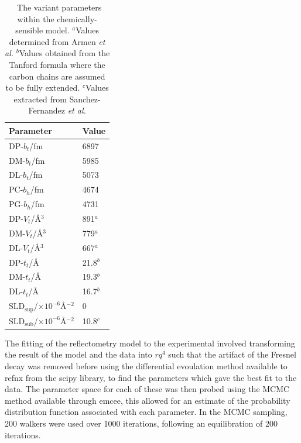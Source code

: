 \documentclass[twoside,twocolumn,9pt]{article}
\begin{document}

\begin{table}[h]
	\small
	\caption{\ The variant parameters within the chemically-sensible model. $^a$Values determined from Armen \emph{et al.}\cite{Armen1998} $^b$Values obtained from the Tanford formula where the carbon chains are assumed to be fully extended.\cite{Tanford1980} $^c$Values extracted from Sanchez-Fernandez \emph{et al.}\cite{Sanchez-Fernandez2016}}
	\label{tab:invariant}
	\begin{tabular*}{0.48\textwidth}{@{\extracolsep{\fill}}ll}
		\hline
		Parameter & Value \\
		\hline
		DP-$b_t$/fm & 6897 \\
		DM-$b_t$/fm & 5985 \\
		DL-$b_t$/fm & 5073 \\
		PC-$b_h$/fm & 4674 \\
		PG-$b_h$/fm & 4731 \\
		DP-$V_t$/\AA$^3$ & 891$^a$ \\
		DM-$V_t$/\AA$^3$ & 779$^a$ \\
		DL-$V_t$/\AA$^3$ & 667$^a$ \\	
		DP-$t_t$/\AA & 21.8$^b$ \\
		DM-$t_t$/\AA & 19.3$^b$ \\
		DL-$t_t$/\AA & 16.7$^b$ \\
		$\text{SLD}_{\text{sup}}$/$\times10^{-6}$\AA$^{-2}$ & 0\\
		$\text{SLD}_{\text{sub}}$/$\times10^{-6}$\AA$^{-2}$ & 10.8$^c$ \\
		\hline
	\end{tabular*}
\end{table}

The fitting of the reflectometry model to the experimental involved transforming the result of the model and the data into $rq^4$ such that the artifact of the Fresnel decay was removed before using the differential evoulation method available to refnx from the scipy library, to find the parameters which gave the best fit to the data. The parameter space for each of these was then probed using the MCMC method available through emcee, this allowed for an estimate of the probability distribution function associated with each parameter. In the MCMC sampling, 200 walkers were used over 1000 iterations, following an equilibration of 200 iterations.
\end{document}
